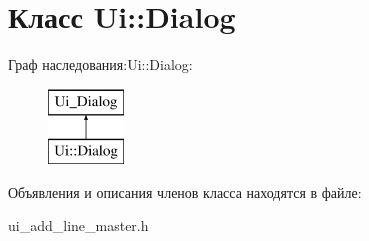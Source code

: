 \hypertarget{class_ui_1_1_dialog}{\section{Класс \-Ui\-:\-:\-Dialog}
\label{class_ui_1_1_dialog}
}
Граф наследования\-:\-Ui\-:\-:\-Dialog\-:\begin{figure}[H]
\begin{center}
\leavevmode
\includegraphics[height=2.000000cm]{class_ui_1_1_dialog}
\end{center}
\end{figure}


Объявления и описания членов класса находятся в файле\-:\begin{DoxyCompactItemize}
\item 
ui\-\_\-add\-\_\-line\-\_\-master.\-h\end{DoxyCompactItemize}
